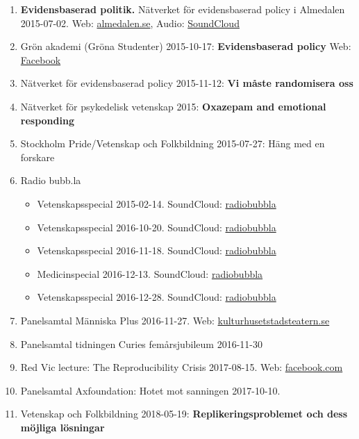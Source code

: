 \documentclass[10pt]{article}
\begin{document}
\begin{enumerate}[nolistsep]
\item {\bf Evidensbaserad politik.} Nätverket för evidensbaserad policy i Almedalen 2015-07-02.
Web: \href{http://www.almedalsveckan.info/event/view/32971}{almedalen.se},
Audio: \href{https://soundcloud.com/stefan-schubert-15/evidensnatverket-almedalen-2015mp3}{SoundCloud}
\item Grön akademi (Gröna Studenter) 2015-10-17: {\bf Evidensbaserad policy}
Web: \href{https://www.facebook.com/events/963649207030580/}{Facebook}
\item Nätverket för evidensbaserad policy 2015-11-12: {\bf Vi måste randomisera oss}
\item Nätverket för psykedelisk vetenskap 2015: {\bf Oxazepam and emotional responding}
\item Stockholm Pride/Vetenskap och Folkbildning 2015-07-27: Häng med en forskare
\item Radio bubb.la
	\begin{itemize}[nolistsep]
	\item Vetenskapsspecial 2015-02-14. SoundCloud: \href{https://soundcloud.com/radiobubbla/lordag-14-februari-tema-vetenskap}{radiobubbla}
	\item Vetenskapsspecial 2016-10-20. SoundCloud: \href{https://soundcloud.com/radiobubbla/torsdag-20-oktober-tema-vetenskap}{radiobubbla}
	\item Vetenskapsspecial 2016-11-18. SoundCloud: \href{https://soundcloud.com/radiobubbla/fredag-18-november-tema-vetenskap}{radiobubbla}
	\item Medicinspecial 2016-12-13. SoundCloud: \href{https://soundcloud.com/radiobubbla/tisdag-13-december-tema-medicin}{radiobubbla}
	\item Vetenskapsspecial 2016-12-28. SoundCloud: \href{https://soundcloud.com/radiobubbla/onsdag-28-december-tema-vetenskap}{radiobubbla}
	\end{itemize}
\item Panelsamtal Människa Plus 2016-11-27. Web: \href{http://kulturhusetstadsteatern.se/ForumDebatt/Evenemang/2016/Manniska-maskin/}{kulturhusetstadsteatern.se}
\item Panelsamtal tidningen Curies femårsjubileum 2016-11-30
\item Red Vic lecture: The Reproducibility Crisis 2017-08-15. Web: \href{https://www.facebook.com/events/1938720233042050/}{facebook.com}
\item Panelsamtal Axfoundation: Hotet mot sanningen 2017-10-10. 
\item Vetenskap och Folkbildning 2018-05-19: {\bf Replikeringsproblemet och dess möjliga lösningar}

\end{enumerate}
\end{document}
